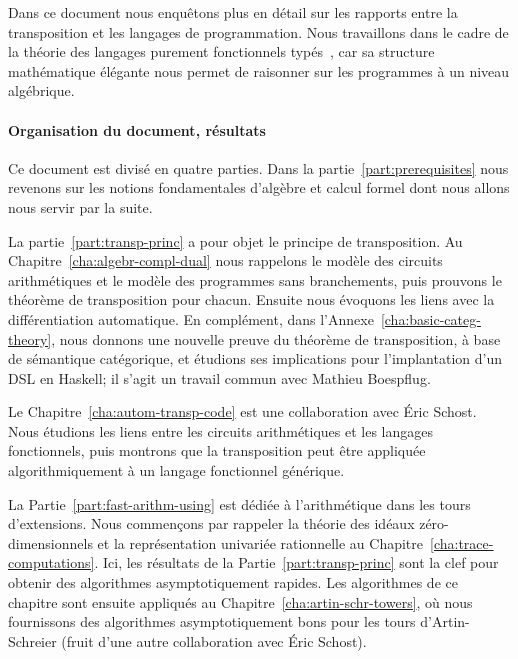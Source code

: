 Dans ce document nous enquêtons plus en détail sur les rapports entre
la transposition et les langages de programmation. Nous travaillons
dans le cadre de la théorie des langages purement fonctionnels
typés~\cite{pierce}, car sa structure mathématique élégante nous
permet de raisonner sur les programmes à un niveau algébrique.

\paragraph*{Organisation du document, résultats}
Ce document est divisé en quatre parties. Dans la
partie~\ref{part:prerequisites} nous revenons sur les notions
fondamentales d'algèbre et calcul formel dont nous allons nous servir
par la suite.

La partie~\ref{part:transp-princ} a pour objet le principe de
transposition. Au Chapitre~\ref{cha:algebr-compl-dual} nous rappelons
le modèle des circuits arithmétiques et le modèle des programmes sans
branchements, puis prouvons le théorème de transposition pour
chacun. Ensuite nous évoquons les liens avec la différentiation
automatique. En complément, dans
l'Annexe~\ref{cha:basic-categ-theory}, nous donnons une nouvelle
preuve du théorème de transposition, à base de sémantique catégorique,
et étudions ses implications pour l'implantation d'un DSL en Haskell;
il s'agit un travail commun avec Mathieu Boespflug.

Le Chapitre~\ref{cha:autom-transp-code} est une collaboration avec
Éric Schost. Nous étudions les liens entre les circuits arithmétiques
et les langages fonctionnels, puis montrons que la transposition peut
être appliquée algorithmiquement à un langage fonctionnel générique.

La Partie~\ref{part:fast-arithm-using} est dédiée à l'arithmétique
dans les tours d'extensions. Nous commençons par rappeler la théorie
des idéaux zéro-dimensionnels et la représen\-tation univariée
rationnelle au Chapitre~\ref{cha:trace-computations}. Ici, les
résultats de la Partie~\ref{part:transp-princ} sont la clef pour
obtenir des algorithmes asymptotiquement rapides. Les algorithmes de
ce chapitre sont ensuite appliqués au
Chapitre~\ref{cha:artin-schr-towers}, où nous fournissons des
algorithmes asymptotiquement bons pour les tours d'Artin-Schreier
(fruit d'une autre collaboration avec Éric Schost).

